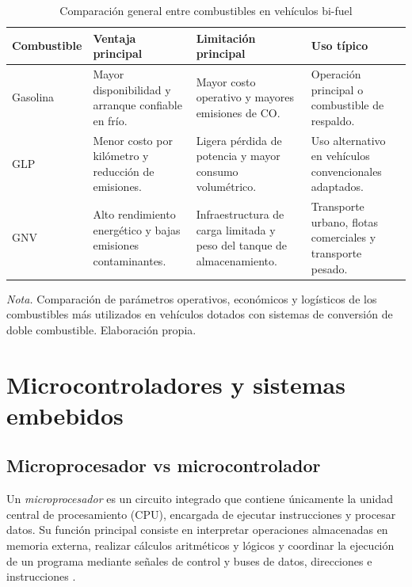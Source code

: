 \begin{table}[H]
	\centering
	\captionsetup{labelformat=simple, labelsep=newline, textfont=it, labelfont=bf}
	\caption{Comparación general entre combustibles en vehículos bi-fuel}
	\label{tab:bifuel}
	\vspace{0.3cm}
	
	\begin{tabularx}{\linewidth}{p{2.8cm} X X X}
		\toprule %
		\rowcolor[rgb]{0.851, 0.851, 0.851}
		\textbf{Combustible} & \textbf{Ventaja principal} & \textbf{Limitación principal} & \textbf{Uso típico} \\
		\midrule %
		Gasolina & Mayor disponibilidad y arranque confiable en frío. & Mayor costo operativo y mayores emisiones de CO. & Operación principal o combustible de respaldo. \\
		\addlinespace
		GLP & Menor costo por kilómetro y reducción de emisiones. & Ligera pérdida de potencia y mayor consumo volumétrico. & Uso alternativo en vehículos convencionales adaptados. \\
		\addlinespace
		GNV & Alto rendimiento energético y bajas emisiones contaminantes. & Infraestructura de carga limitada y peso del tanque de almacenamiento. & Transporte urbano, flotas comerciales y transporte pesado. \\
		\bottomrule %
	\end{tabularx}
	\vspace{0.2cm}
	
	\begin{flushleft}
		\footnotesize \textit{Nota.} Comparación de parámetros operativos, económicos y logísticos de los combustibles más utilizados en vehículos dotados con sistemas de conversión de doble combustible. Elaboración propia.
	\end{flushleft}
\end{table}


\section{Microcontroladores y sistemas embebidos}


\subsection{Microprocesador vs microcontrolador}
Un \textit{microprocesador} es un circuito integrado que contiene únicamente la unidad central de procesamiento (CPU), encargada de ejecutar instrucciones y procesar datos. Su función principal consiste en interpretar operaciones almacenadas en memoria externa, realizar cálculos aritméticos y lógicos y coordinar la ejecución de un programa mediante señales de control y buses de datos, direcciones e instrucciones .

